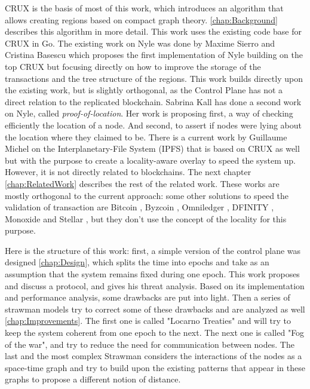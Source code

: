 \documentclass[a4paper,11pt,oneside]{report}
\begin{document}
 CRUX \cite{Basescu2014} is the basis of most of this work, which introduces an algorithm that allows creating regions based on compact graph theory. 
\autoref{chap:Background} describes this algorithm in more detail.  This work uses the existing code base for CRUX
 in Go. The existing work on Nyle was done by
Maxime Sierro and Cristina Basescu \cite{Sierro2019} which proposes the first
implementation of Nyle building on the top CRUX \cite{Basescu2014} but focusing
directly on how to improve the storage of the transactions and the tree
structure of the regions. This work builds directly upon the existing work, but
is slightly orthogonal, as the Control Plane has not a direct relation to the
replicated blockchain. Sabrina Kall \cite{Kall2019} has done a second work on Nyle, called \textit{proof-of-location}.  Her work is proposing first, a way of checking
efficiently the location of a node. And second,  to assert if nodes were lying about the
location where they claimed to be. There is a current work by Guillaume
Michel on the Interplanetary-File System (IPFS) \cite{Michel2019} that is
based on CRUX as well but with the purpose to create a locality-aware overlay
to speed the system up. However, it is not directly related to blockchains. The next chapter \autoref{chap:RelatedWork} describes the rest
of the related work. 
These works are mostly orthogonal to the current approach: some other solutions to speed
the validation of transaction are Bitcoin \cite{Nakamoto2009}, Byzcoin
\cite{Kogias2016}, Omniledger \cite{Kokoris-Kogias2017}, DFINITY
\cite{Hanke2018}, Monoxide \cite{Wang2019} and Stellar \cite{Lokhava2019}, but
they don't use the concept of the locality for this purpose. 

Here is the structure of this work: first, a simple version of
the control plane was designed \autoref{chap:Design}, which splits the time
into epochs and take as an assumption that the system remains fixed during one
epoch. This work proposes and discuss a protocol, and gives his threat analysis.
Based on its implementation and performance analysis, some drawbacks are put
into light. Then a series of strawman models try to correct some of these
drawbacks and are analyzed as well \autoref{chap:Improvements}. The first one
is called "Locarno Treaties" and will try to keep the system coherent from one
epoch to the next. The next one is called "Fog of the war", and try to reduce
the need for communication between nodes. The last and the most complex
Strawman considers the interactions of the nodes as a space-time graph and try
to build upon the existing patterns that appear in these graphs to propose a
different notion of distance. 
\end{document}
